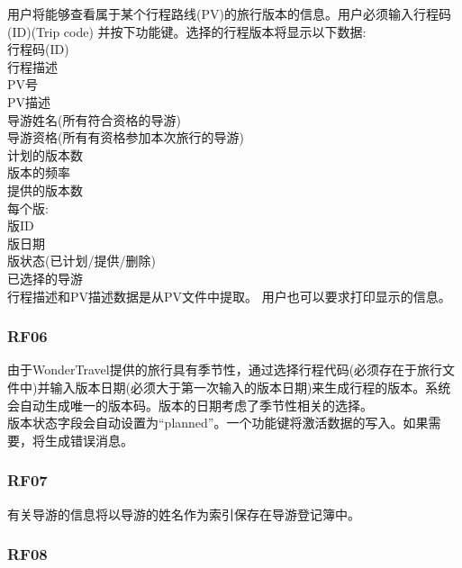 用户将能够查看属于某个行程路线(PV)的旅行版本的信息。用户必须输入行程码(ID)(Trip code) 并按下功能键。选择的行程版本将显示以下数据:\\

行程码(ID)\\
行程描述\\
PV号\\
PV描述\\
导游姓名(所有符合资格的导游)\\
导游资格(所有有资格参加本次旅行的导游)\\
计划的版本数\\
版本的频率\\
提供的版本数\\
每个版:\\

版ID\\
版日期\\
版状态(已计划/提供/删除)\\
已选择的导游\\

行程描述和PV描述数据是从PV文件中提取。 用户也可以要求打印显示的信息。\\


\hypertarget{ux63a5ux4e58ux5ba2}{%
\subsubsection{RF06}\label{ux63a5ux4e58ux5ba2}}

由于WonderTravel提供的旅行具有季节性，通过选择行程代码(必须存在于旅行文件中)并输入版本日期(必须大于第一次输入的版本日期)来生成行程的版本。系统会自动生成唯一的版本码。版本的日期考虑了季节性相关的选择。\\
版本状态字段会自动设置为“planned”。一个功能键将激活数据的写入。如果需要，将生成错误消息。


\hypertarget{ux63a5ux4e58ux5ba2}{%
\subsubsection{RF07}\label{ux63a5ux4e58ux5ba2}}

有关导游的信息将以导游的姓名作为索引保存在导游登记簿中。\\


\hypertarget{ux63a5ux4e58ux5ba2}{%
\subsubsection{RF08}\label{ux63a5ux4e58ux5ba2}}

